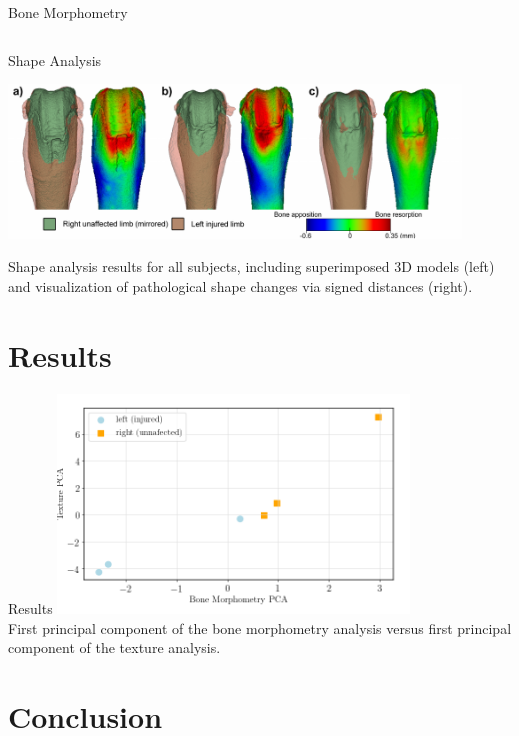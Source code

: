 \documentclass[10pt,aspectratio=169]{beamer}
\begin{document}
\begin{frame}{Bone Morphometry}
\begin{columns}[onlytextwidth]
\begin{columns}
    \end{columns}
  \end{columns}
\end{frame}

\begin{frame}{Shape Analysis}
  \begin{center}
  \includegraphics[width=0.9\textwidth]{./figures/analysis_shape.png}\\
  \end{center}
  \vspace{0.1cm}
  \centering
  Shape analysis results for all subjects, including superimposed 3D models (left) and visualization of pathological shape changes via signed distances (right).
\end{frame}

{
\section{Results}
\begin{frame}{Results}
  \centering
  \includegraphics[width=0.7\textwidth]{./figures/features_pcaBoneVSpcaTexture1000Bins.png}\\
  \vspace{0.1cm}
  First principal component of the bone morphometry analysis versus first principal component of the texture analysis.
\end{frame}
}

\section{Conclusion}
\end{document}
